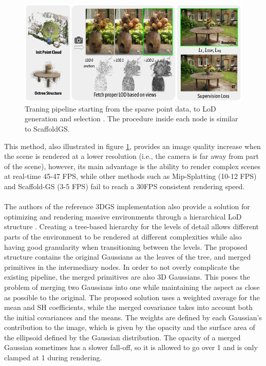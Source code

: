 \begin{figure}[H]
    \centering
    \includegraphics[width=0.8\linewidth]{figures/octreegs.png}
    \caption{Traning pipeline starting from the sparse point data, to LoD generation and selection \cite{ren2024octreegs}. The procedure inside each node is similar to ScaffoldGS.}
    \label{fig:octreegs_pipeline}
\end{figure}

This method, also illustrated in figure \ref{fig:octreegs_pipeline}, provides an image quality increase when the scene is rendered at a lower resolution (i.e., the camera is far away from part of the scene), however, its main advantage is the ability to render complex scenes at real-time 45-47 FPS, while other methods such as Mip-Splatting (10-12 FPS) and Scaffold-GS (3-5 FPS) fail to reach a 30FPS consistent rendering speed.

\paragraph{}
The authors of the reference 3DGS implementation also provide a solution for optimizing and rendering massive environments through a hierarchical LoD structure \cite{kerbl_hierarchy}. Creating a tree-based hierarchy for the levels of detail allows different parts of the environment to be rendered at different complexities while also having good granularity when transitioning between the levels. The proposed structure contains the original Gaussians as the leaves of the tree, and merged primitives in the intermediary nodes. In order to not overly complicate the existing pipeline, the merged primitives are also 3D Gaussians. This poses the problem of merging two Gaussians into one while maintaining the aspect as close as possible to the original. The proposed solution uses a weighted average for the mean and SH coefficients, while the merged covariance takes into account both the initial covariances and the means. The weights are defined by each Gaussian's contribution to the image, which is given by the opacity and the surface area of the ellipsoid defined by the Gaussian distribution. The opacity of a merged Gaussian sometimes has a slower fall-off, so it is allowed to go over 1 and is only clamped at 1 during rendering.


